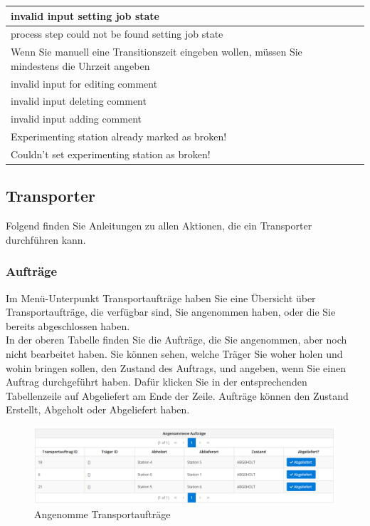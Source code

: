 \documentclass[enabledeprecatedfontcommands,fontsize=12pt,paper=a4,twoside]{scrartcl}
\begin{document}
\begin{longtable}[c]{|p{5cm}|p{10cm}|}
invalid input setting job state & \\ \hline
process step could not be found setting job state & \\ \hline
Wenn Sie manuell eine Transitionszeit eingeben wollen, müssen Sie mindestens die Uhrzeit angeben & \\ \hline
invalid input for editing comment & \\ \hline
invalid input deleting comment & \\ \hline
invalid input adding comment & \\ \hline
Experimenting station already marked as broken! & \\ \hline
Couldn't set experimenting station as broken! & \\ \hline
\end{longtable}
\subsection{Transporter}

Folgend finden Sie Anleitungen zu allen Aktionen, die ein Transporter durchführen kann. \\

\subsubsection{Aufträge}
Im Menü-Unterpunkt Transportaufträge haben Sie eine Übersicht über Transportaufträge, die verfügbar sind, Sie angenommen haben, oder die Sie bereits abgeschlossen haben. \\

In der oberen Tabelle finden Sie die Aufträge, die Sie angenommen, aber noch nicht bearbeitet haben. Sie können sehen, welche Träger Sie woher holen und wohin bringen sollen, den Zustand des Auftrags, und angeben, wenn Sie einen Auftrag durchgeführt haben. Dafür klicken Sie in der entsprechenden Tabellenzeile auf Abgeliefert am Ende der Zeile. Aufträge können den Zustand Erstellt, Abgeholt oder Abgeliefert haben. \\

\begin{figure}[h!]
\begin{center}
 \includegraphics[width=\textwidth]{screenshots/tr/angenommen.png}
  \caption{Angenomme Transportaufträge}
  \label{fig:boat2}
\end{center}
\end{figure}
\end{document}

